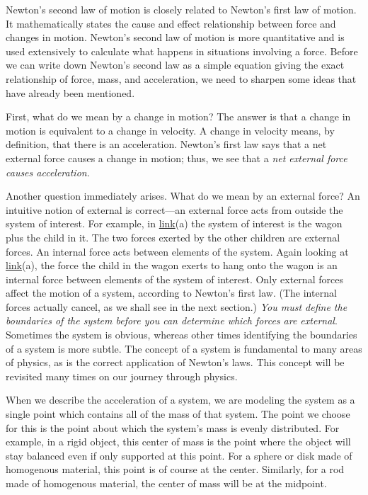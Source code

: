 \documentclass[
]{book}
\begin{document}
\protect\hypertarget{import-auto-id765465}{}{Newton's second law of motion}
is closely related to Newton's first law of motion. It mathematically
states the cause and effect relationship between force and changes in
motion. Newton's second law of motion is more quantitative and is used
extensively to calculate what happens in situations involving a force.
Before we can write down Newton's second law as a simple equation giving
the exact relationship of force, mass, and acceleration, we need to
sharpen some ideas that have already been mentioned.

First, what do we mean by a change in motion? The answer is that a
change in motion is equivalent to a change in velocity. A change in
velocity means, by definition, that there is an
\protect\hypertarget{import-auto-id3190786}{}{acceleration}. Newton's first
law says that a net external force causes a change in motion; thus, we
see that a \emph{net external force causes acceleration}.

Another question immediately arises. What do we mean by an external
force? An intuitive notion of external is correct---an \protect\hypertarget{import-auto-id3026856}{}{external
force} acts from outside the
{system} of interest. For example, in
\protect\hyperlink{import-auto-id1993910}{link}(a) the system of
interest is the wagon plus the child in it. The two forces exerted by
the other children are external forces. An internal force acts between
elements of the system. Again looking at
\protect\hyperlink{import-auto-id1993910}{link}(a), the force the
child in the wagon exerts to hang onto the wagon is an internal force
between elements of the system of interest. Only external forces affect
the motion of a system, according to Newton's first law. (The internal
forces actually cancel, as we shall see in the next section.) \emph{You must
define the boundaries of the system before you can determine which
forces are external}. Sometimes the system is obvious, whereas other
times identifying the boundaries of a system is more subtle. The concept
of a system is fundamental to many areas of physics, as is the correct
application of Newton's laws. This concept will be revisited many times
on our journey through physics.

When we describe the acceleration of a system, we are modeling the
system as a single point which contains all of the mass of that system.
The point we choose for this is the point about which the system's mass
is evenly distributed. For example, in a rigid object, this center of
mass is the point where the object will stay balanced even if only
supported at this point. For a sphere or disk made of homogenous
material, this point is of course at the center. Similarly, for a rod
made of homogenous material, the center of mass will be at the midpoint.
\end{document}
